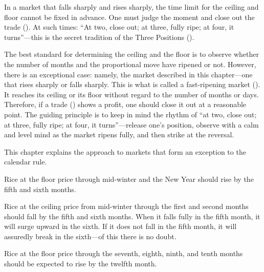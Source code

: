 
\begin{sokyubox}
{\small\itshape\color{sokyubar} }

\medskip
In a market that falls sharply and rises sharply, the time limit for the
ceiling and floor cannot be fixed in advance. One must judge the moment
and close out the trade (). At such times: ``At
two, close out; at three, fully ripe; at four, it turns''---this is the
secret tradition of the Three Positions ().
\end{sokyubox}

\commentary
The best standard for determining the ceiling and the floor is to
observe whether the number of months and the proportional move have
ripened or not. However, there is an exceptional case: namely, the
market described in this chapter---one that rises sharply or falls
sharply. This is what is called a fast-ripening market
(). It reaches its ceiling or its floor
without regard to the number of months or days. Therefore, if a trade
() shows a profit, one should close it out at a
reasonable point. The guiding principle is to keep in mind the rhythm of
``at two, close out; at three, fully ripe; at four, it turns''---release
one's position, observe with a calm and level mind as the market ripens
fully, and then strike at the reversal.

This chapter explains the approach to markets that form an exception to
the calendar rule.


\begin{sokyubox}
{\small\itshape\color{sokyubar} }

\medskip
Rice at the floor price through mid-winter and the New Year should rise
by the fifth and sixth months.

Rice at the ceiling price from mid-winter through the first and second
months should fall by the fifth and sixth months. When it falls fully in
the fifth month, it will surge upward in the sixth. If it does not fall
in the fifth month, it will assuredly break in the sixth---of this there
is no doubt.

Rice at the floor price through the seventh, eighth, ninth, and tenth
months should be expected to rise by the twelfth month.
\end{sokyubox}


